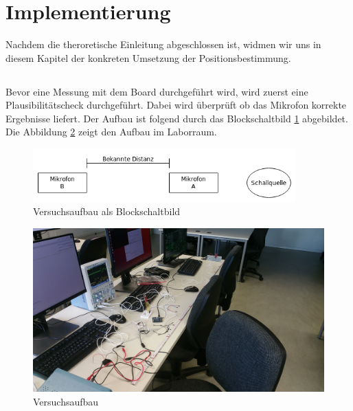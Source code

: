 \newpage
\section{Implementierung}
Nachdem die theroretische Einleitung abgeschlossen ist, widmen wir uns in diesem Kapitel der konkreten Umsetzung der Positionsbestimmung.

\subsection{\microphone}
Bevor eine Messung mit dem Board durchgeführt wird, wird zuerst eine Plausibilitätscheck durchgeführt. Dabei wird überprüft ob das \microphone \platz Mikrofon korrekte Ergebnisse liefert. Der Aufbau ist folgend durch das Blockschaltbild \ref{img:blockschaltbild_plausibilitaetscheck} abgebildet. Die Abbildung \ref{img:picture_plausibilitaetscheck} zeigt den Aufbau im Laborraum.

\begin{figure}[H]
        \centering
        \includegraphics[width=0.9\textwidth]{images/plausibilitaetscheck.png}
        \caption{Versuchsaufbau als Blockschaltbild}
        \label{img:blockschaltbild_plausibilitaetscheck}
\end{figure}

\begin{figure}[H]
        \centering
        \hspace*{-1.9cm}
        \includegraphics[width=1.2\textwidth]{images/plausibilitaetscheck_sparkfun_foto.jpg}
        \caption{Versuchsaufbau}
        \label{img:picture_plausibilitaetscheck}
\end{figure}

